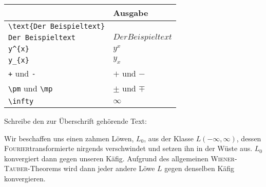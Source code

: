\documentclass["WS\space 16-17\space -\space LaTeX-Kurs\space -\space Praesentation\space -\space 1.tex"]{subfiles}
\begin{document}
\begin{frame}[fragile]
	\begin{center}
		\begin{tabular}{ll}
			\toprule
			\color{math-cmd}{Mathe}\color{black}{-Befehl}									&	Ausgabe					\\ \midrule
			\lstinline|\text{Der Beispieltext}|		&	\text{Der Beispieltext}	\\
			\lstinline|Der Beispieltext|			&	$Der Beispieltext$		\\
			\lstinline|y^{x}|						&	$y^{x}$					\\
			\lstinline|y_{x}|						&	$y_{x}$					\\
			\lstinline|+|	und 	\lstinline|-|	&	$+$	und $-$				\\
			\lstinline|\pm| und \lstinline|\mp|		&	$\pm$ und $\mp$			\\
			\lstinline|\infty|						&	$\infty$			    \\
			\bottomrule
		\end{tabular}
	\end{center}
	\pause\btVFill
	\Aufgabee
		Schreibe den zur Überschrift  gehörende Text:
	\begin{outputbox}
		Wir beschaffen uns einen zahmen Löwen, $L_0$, aus der Klasse $L(- \infty, \infty)$, dessen \textsc{Fourier}transformierte nirgends verschwindet und setzen ihn in der Wüste aus. $L_0$ konvergiert dann gegen unseren Käfig. Aufgrund des allgemeinen \textsc{Wiener}-\textsc{Tauber}-Theorems wird dann jeder andere Löwe $L$ gegen denselben Käfig konvergieren.
	\end{outputbox}
	\vspace{0.3cm}
\end{frame}
\end{document}
